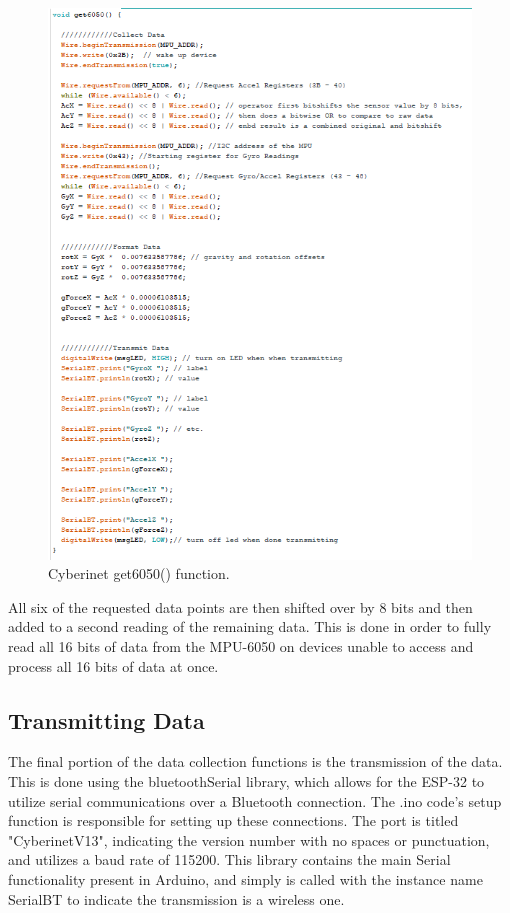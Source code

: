 \begin{center}
    \begin{figure}
        \centering
        \includegraphics{diagrams/maxPatches/get6050.png}
        \caption[scale=1.5]{Cyberinet get6050() function.}
        \label{fig:get6050}
    \end{figure}
\end{center}

All six of the requested data points are then shifted over by 8 bits and then added to a second reading of the remaining data. This is done in order to fully read all 16 bits of data from the MPU-6050 on devices unable to access and process all 16 bits of data at once. 


\subsection{Transmitting Data}
The final portion of the data collection functions is the transmission of the data. This is done using the bluetoothSerial library, which allows for the ESP-32 to utilize serial communications over a Bluetooth connection. The .ino code's setup function is responsible for setting up these connections. The port is titled "CyberinetV13", indicating the version number with no spaces or punctuation, and utilizes a baud rate of 115200. This library contains the main Serial functionality present in Arduino, and simply is called with the instance name SerialBT to indicate the transmission is a wireless one.

